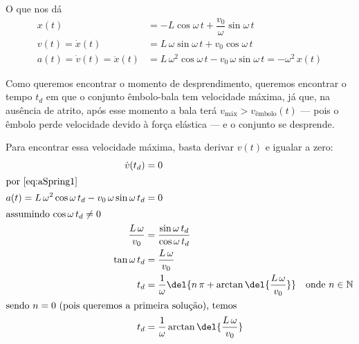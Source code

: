\documentclass[]{IMTexam}
\begin{document}
\begin{questions}
\begin{solution}
		O que nos dá
		\begin{align}
			x(t)                          & =-L\cos\omega\,t+\dfrac{v_0}{\omega}\sin\omega\,t\label{eq:xSpring}                       \\
			v(t)             =\dot{x}(t)  & =L\,\omega\sin\omega\,t+v_0\cos\omega\,t\label{eq:vSpring1}                               \\
			a(t) =\dot{v}(t) =\ddot{x}(t) & =L\,\omega^{2}\cos\omega\,t-v_0\,\omega\sin\omega\,t=-\omega^{2}\,x(t)\label{eq:aSpring1}
		\end{align}

		Como queremos encontrar o momento de desprendimento, queremos encontrar o tempo $ t_d $ em que o conjunto êmbolo-bala tem velocidade máxima, já que, na ausência de atrito, após esse momento a bala terá $ v_{\text{máx}}>v_{\text{êmbolo}}(t) $ --- pois o êmbolo perde velocidade devido à força elástica --- e o conjunto se desprende.

		Para encontrar essa velocidade máxima, basta derivar $ v(t) $ e igualar a zero:
		\begin{align*}
			\dot{v}(t_d)                                                 & =0                                                                                                    \\
			\intertext{por \ref{eq:aSpring1}}
			a(t)=L\,\omega^{2}\cos\omega\,t_d-v_0\,\omega\sin\omega\,t_d & =0                                                                                                    \\
			\intertext{assumindo $ \cos\omega\,t_d\neq0 $}
			\dfrac{L\,\omega}{v_0}                                       & =\dfrac{\sin\omega\,t_d}{\cos\omega\,t_d}                                                             \\
			\tan\omega\,t_d                                              & =\dfrac{L\,\omega}{v_0}                                                                               \\
			t_d                                                          & =\dfrac{1}{\omega}\del{n\,\pi+\arctan\del{\dfrac{L\,\omega}{v_0}}}\quad\text{onde $ n\in\mathbb{N} $} \\
			\intertext{sendo $ n=0 $ (pois queremos a primeira solução), temos}
			t_d                                                          & =\dfrac{1}{\omega}\arctan\del{\dfrac{L\,\omega}{v_0}}
		\end{align*}


\end{solution}
\end{questions}
\end{document}
